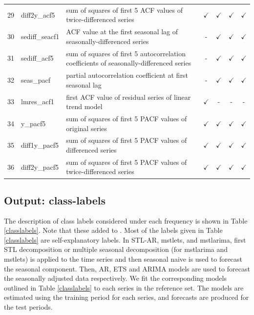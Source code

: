 \documentclass[11pt,a4paper,]{article}
\def\yes{$\checkmark$}
\begin{document}
\begin{table}[!htp]
\begin{tabular}{llp{}cccc}
29 & diff2y\_acf5   & sum of squares of first 5 ACF values of twice-differenced series                        & \yes  & \yes & \yes & \yes \\
30 & sediff\_seacf1 & ACF value at the first seasonal lag of seasonally-differenced series                    & -     & \yes & \yes & \yes\\
31 & sediff\_acf5   & sum of squares of first 5 autocorrelation coefficients of seasonally-differenced series & -     & \yes & \yes & \yes\\
32 & seas\_pacf     & partial autocorrelation coefficient at first seasonal lag & -     & \yes & \yes & \yes\\
33 & lmres\_acf1    & first ACF value of residual series of linear trend model                                & \yes  & - & - & -\\
34 & y\_pacf5       & sum of squares of first 5 PACF values of original series                                & \yes  & \yes & \yes & \yes\\
35 & diff1y\_pacf5  & sum of squares of first 5 PACF values of differenced series                             & \yes  & \yes & \yes & \yes\\
36 & diff2y\_pacf5  & sum of squares of first 5 PACF values of twice-differenced series                       & \yes  & \yes & \yes & \yes\\
\bottomrule
\end{tabular}
\end{table}

\hypertarget{output-class-labels}{%
\subsection{Output: class-labels}\label{output-class-labels}}

The description of class labels considered under each frequency is shown in Table \ref{classlabels}. Note that these added to \textcite{fforms}. Most of the labels given in Table \ref{classlabels} are self-explanatory labels. In STL-AR, mstlets, and mstlarima, first STL decomposition or multiple seasonal decomposition (for mstlarima and mstlets) is applied to the time series and then seasonal naive is used to forecast the seasonal component. Then, AR, ETS and ARIMA models are used to forecast the seasonally adjusted data respectively. We fit the corresponding models outlined in Table \ref{classlabels} to each series in the reference set. The models are estimated using the training period for each series, and forecasts are produced for the test periods.
\end{document}
